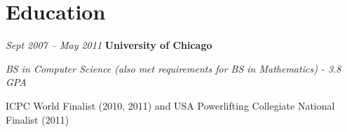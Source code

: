 \documentclass[10pt, letterpaper]{article}
\begin{document}
\section{Education}

\begin{twocolentry}{
    \textit{Sept 2007 – May 2011}
}
    \textbf{University of Chicago}
\end{twocolentry}

\begin{onecolentry}
    \textit{BS in Computer Science (also met requirements for BS in Mathematics) - 3.8 GPA}
\end{onecolentry}

\vspace{0.1 cm}

\begin{onecolentry}
    \begin{highlights}
        \item ICPC World Finalist (2010, 2011) and USA Powerlifting Collegiate National Finalist (2011)
    \end{highlights}
\end{onecolentry}
\end{document}
